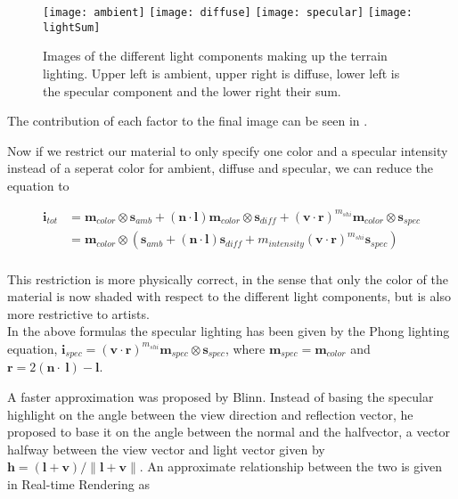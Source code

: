
\begin{figure}
  \label{fig:lightComponents}
  \centering
  \texttt{[image: ambient]}
  \texttt{[image: diffuse]}
  \texttt{[image: specular]}
  \texttt{[image: lightSum]}
  \caption{Images of the different light components making up the
    terrain lighting. Upper left is ambient, upper right is diffuse,
    lower left is the specular component and the lower right their sum.}
\end{figure}


The contribution of each factor to the final image can be seen in
.

Now if we restrict our material to only specify one color and a
specular intensity instead of a seperat color for ambient, diffuse and
specular, we can reduce the equation to

\begin{displaymath}
  \begin{array}{rl}
    \mathbf{i}_{tot} &= \mathbf{m}_{color} \otimes \mathbf{s}_{amb} + (\mathbf{n} \cdot
    \mathbf{l}) \mathbf{m}_{color} \otimes \mathbf{s}_{diff} +
    (\mathbf{v} \cdot \mathbf{r})^{m_{shi}} \mathbf{m}_{color} \otimes
    \mathbf{s}_{spec} \\
    &= \mathbf{m}_{color} \otimes (\mathbf{s}_{amb} + (\mathbf{n} \cdot
    \mathbf{l}) \mathbf{s}_{diff} + m_{intensity} (\mathbf{v} \cdot
    \mathbf{r})^{m_{shi}} \mathbf{s}_{spec}) \\
  \end{array}
\end{displaymath}

This restriction is more physically correct, in the sense that only
the color of the material is now shaded with respect to the different
light components, but is also more restrictive to artists.\\


In the above formulas the specular lighting has been given by the
Phong lighting equation, $\mathbf{i}_{spec} = (\mathbf{v} \cdot
\mathbf{r})^{m_{shi}} \mathbf{m}_{spec} \otimes \mathbf{s}_{spec}$,
where $\mathbf{m}_{spec} = \mathbf{m}_{color}$ and $\mathbf{r} = 2
(\mathbf{n} \cdot \ \mathbf{l}) - \mathbf{l}$.

A faster approximation was proposed by Blinn. Instead of basing the
specular highlight on the angle between the view direction and
reflection vector, he proposed to base it on the angle between the
normal and the halfvector, a vector halfway between the view vector
and light vector given by $\mathbf{h} = (\mathbf{l} + \mathbf{v}) /
\|\mathbf{l} + \mathbf{v}\|$. An approximate relationship between the
two is given in Real-time Rendering as

